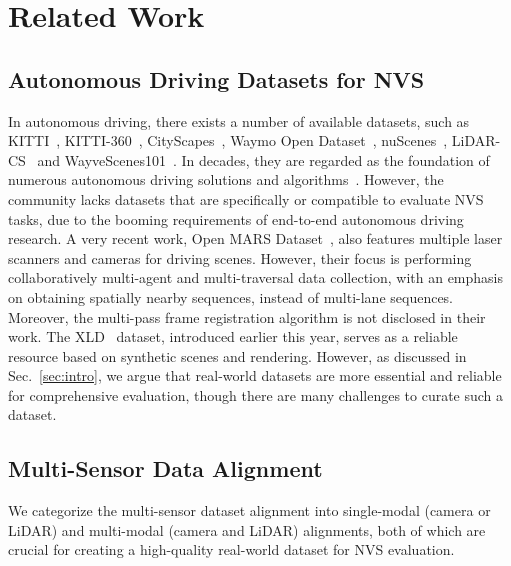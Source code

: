 \section{Related Work}
\label{sec:rel_work}

\subsection{Autonomous Driving Datasets for NVS} 
In autonomous driving, there exists a number of available datasets, such as KITTI~\cite{geiger2012kitti}, KITTI-360~\cite{liao2022kitti360}, CityScapes~\cite{cordts2016cityscapes}, Waymo Open Dataset~\cite{sun2020waymo}, nuScenes~\cite{caesar2020nuscenes}, LiDAR-CS~\cite{fang2024lidar} and WayveScenes101~\cite{zürn2024wayvescenes101datasetbenchmarknovel}. In decades, they are regarded as the foundation of numerous autonomous driving solutions and algorithms~\cite{hu2023uniad,liao2023MapTR,chen2023e2esurvey}. However, the community lacks datasets that are specifically or compatible to evaluate NVS tasks, due to the booming requirements of end-to-end autonomous driving research. 
A very recent work, Open MARS Dataset~\cite{li2024openmars}, also features multiple laser scanners and cameras for driving scenes. However, their focus is performing collaboratively multi-agent and multi-traversal data collection, with an emphasis on obtaining spatially nearby sequences, instead of multi-lane sequences. Moreover, the multi-pass frame registration algorithm is not disclosed in their work.
The XLD~\cite{li2024xld} dataset, introduced earlier this year, serves as a reliable resource based on synthetic scenes and rendering. However, as discussed in Sec.~\ref{sec:intro}, we argue that real-world datasets are more essential and reliable for comprehensive evaluation, though there are many challenges to curate such a dataset.

\subsection{Multi-Sensor Data Alignment} 
We categorize the multi-sensor dataset alignment into single-modal (camera or LiDAR) and multi-modal (camera and LiDAR) alignments, both of which are crucial for creating a high-quality real-world dataset for NVS evaluation.

